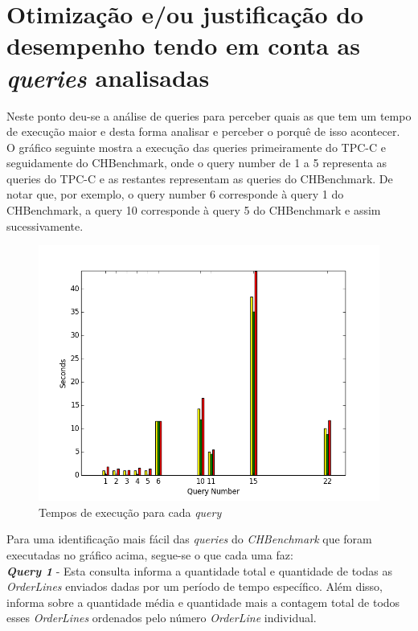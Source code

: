\section{Otimização e/ou justificação do desempenho tendo em conta as \textit{queries} analisadas}

Neste ponto deu-se a análise de queries para perceber quais as que tem um tempo de execução maior e desta forma analisar e perceber o porquê de isso acontecer. O gráfico seguinte mostra a execução das queries primeiramente do TPC-C e seguidamente do CHBenchmark, onde o query number de 1 a 5 representa as queries do TPC-C e as restantes representam as queries do CHBenchmark. De notar que, por exemplo, o query number 6 corresponde à query 1 do CHBenchmark, a query 10 corresponde à query 5 do CHBenchmark e assim sucessivamente.

\begin{figure}[ht!]
\centering
\includegraphics[width=\textwidth]{img/00_conf_initial}
\caption{Tempos de execução para cada \textit{query} \label{overflow}}
\end{figure}

Para uma identificação mais fácil das \textit{queries} do \textit{CHBenchmark} que foram executadas no gráfico acima, segue-se o que cada uma faz:
\\

\textbf{\textit{Query 1}} - Esta consulta informa a quantidade total e quantidade de todas as \textit{OrderLines} enviados dadas por um período de tempo específico. Além disso, informa sobre a quantidade média e quantidade mais a contagem total de todos esses \textit{OrderLines} ordenados pelo número \textit{OrderLine} individual.

